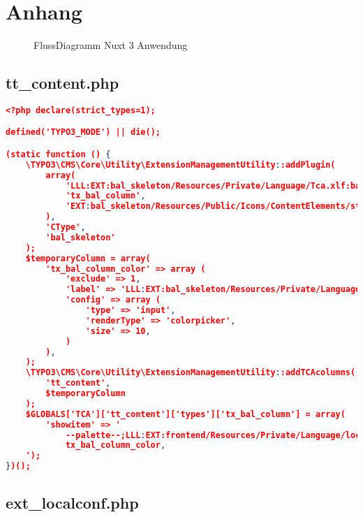 \section{Anhang}

\begin{figure}[htb]
\centering
{}
\caption{FlussDiagramm Nuxt 3 Anwendung}
\label{fig:FlussDiagramm}
\end{figure}

\pagebreak

\subsection{tt\_content.php}
\label{tt_content.php}

\begin{lstlisting}[language=json,firstnumber=1]
<?php declare(strict_types=1);

defined('TYPO3_MODE') || die();

(static function () {
    \TYPO3\CMS\Core\Utility\ExtensionManagementUtility::addPlugin(
        array(
            'LLL:EXT:bal_skeleton/Resources/Private/Language/Tca.xlf:bal_column.wizard.title',
            'tx_bal_column',
            'EXT:bal_skeleton/Resources/Public/Icons/ContentElements/stage.png'
        ),
        'CType',
        'bal_skeleton'
    );
    $temporaryColumn = array(
        'tx_bal_column_color' => array (
            'exclude' => 1,
            'label' => 'LLL:EXT:bal_skeleton/Resources/Private/Language/Tca.xlf:bal_column.color.title',
            'config' => array (
                'type' => 'input',
                'renderType' => 'colorpicker',
                'size' => 10,
            )
        ),
    );
    \TYPO3\CMS\Core\Utility\ExtensionManagementUtility::addTCAcolumns(
        'tt_content',
        $temporaryColumn
    );
    $GLOBALS['TCA']['tt_content']['types']['tx_bal_column'] = array(
        'showitem' => '
            --palette--;LLL:EXT:frontend/Resources/Private/Language/locallang_ttc.xml:palette.general;general,
            tx_bal_column_color,
    ');
})();
\end{lstlisting}

\subsection{ext\_localconf.php}
\label{ext_localconf.php}

